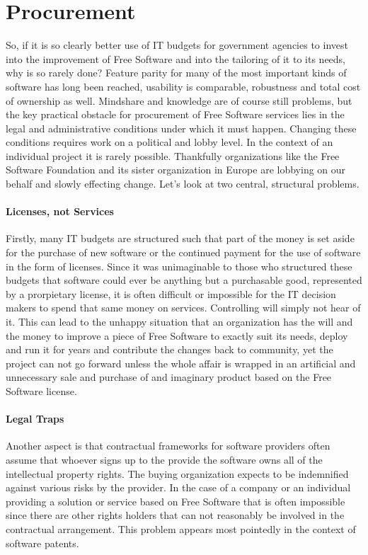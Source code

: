 \section*{Procurement}

So, if it is so clearly better use of IT budgets for government agencies to invest
into the improvement of Free Software and into the tailoring of it to its needs, why is
so rarely done? Feature parity for many of the most important kinds of software has
long been reached, usability is comparable, robustness and total cost of ownership
as well. Mindshare and knowledge are of course still problems, but the key practical obstacle
for procurement of Free Software services lies in the legal and administrative
conditions under which it must happen. Changing these conditions requires work
on a political and lobby level. In the context of an individual project it is
rarely possible. Thankfully organizations like the Free Software Foundation and
its sister organization in Europe are lobbying on our behalf and slowly effecting
change. Let's look at two central, structural problems.

\paragraph*{Licenses, not Services}

Firstly, many IT budgets are structured such that part of the money is set aside
for the purchase of new software or the continued payment for the use of software
in the form of licenses. Since it was unimaginable to those who structured these
budgets that software could ever be anything but a purchasable good, represented
by a prorpietary license, it is often difficult or impossible for the IT decision
makers to spend that same money on services. Controlling will simply not hear of it.
This can lead to the unhappy situation that an organization has the will and the
money to improve a piece of Free Software to exactly suit its needs, deploy and run
it for years and contribute the changes back to community, yet the project can not
go forward unless the whole affair is wrapped in an artificial and unnecessary sale
and purchase of and imaginary product based on the Free Software license.

\paragraph*{Legal Traps}

Another aspect is that contractual frameworks for software providers often assume
that whoever signs up to the provide the software owns all of the intellectual
property rights. The buying organization expects to be indemnified against various
risks by the provider. In the case of a company or an individual providing a solution
or service based on Free Software that is often impossible since there are other
rights holders that can not reasonably be involved in the contractual arrangement.
This problem appears most pointedly in the context of software patents.


